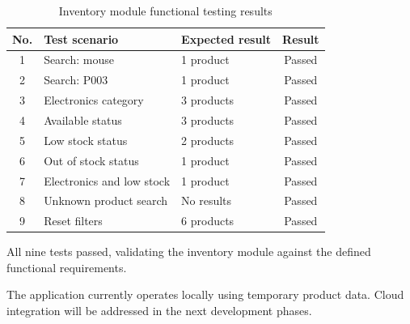 \begin{table}[htbp]
    \centering
    \small

    \begin{tabular}{cllc}
        \toprule

        \textbf{No.} &
        \textbf{Test scenario} &
        \textbf{Expected result} &
        \textbf{Result} \\

        \midrule

        1 & Search: mouse & 1 product & Passed \\
        2 & Search: P003 & 1 product & Passed \\
        3 & Electronics category & 3 products & Passed \\
        4 & Available status & 3 products & Passed \\
        5 & Low stock status & 2 products & Passed \\
        6 & Out of stock status & 1 product & Passed \\
        7 & Electronics and low stock & 1 product & Passed \\
        8 & Unknown product search & No results & Passed \\
        9 & Reset filters & 6 products & Passed \\

        \bottomrule
    \end{tabular}

    \caption{Inventory module functional testing results}
    \label{tab:inventory-tests}
\end{table}

All nine tests passed, validating the inventory
module against the defined functional requirements.

The application currently operates locally using
temporary product data. Cloud integration will be
addressed in the next development phases.
